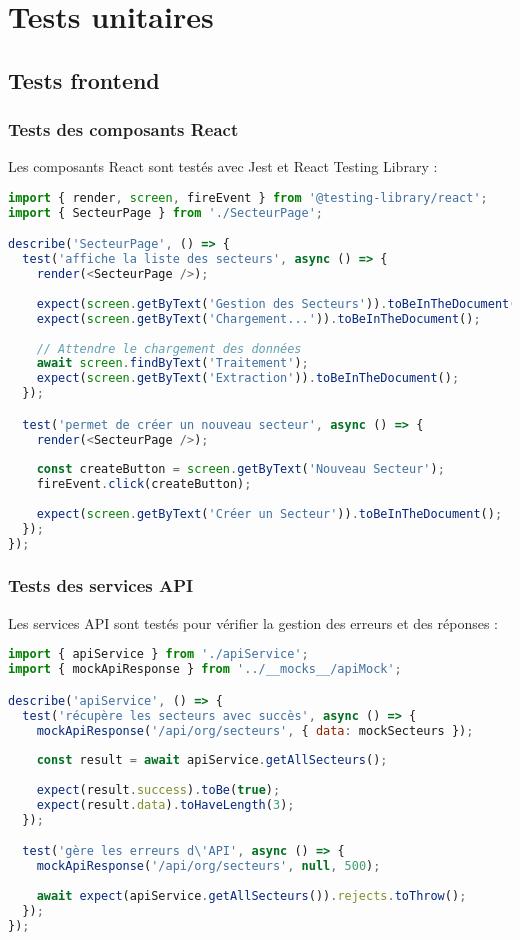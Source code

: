 \section{Tests unitaires}
\subsection{Tests frontend}
\subsubsection{Tests des composants React}
Les composants React sont testés avec Jest et React Testing Library :

\begin{lstlisting}[language=JavaScript, caption=Test d'un composant React]
import { render, screen, fireEvent } from '@testing-library/react';
import { SecteurPage } from './SecteurPage';

describe('SecteurPage', () => {
  test('affiche la liste des secteurs', async () => {
    render(<SecteurPage />);
    
    expect(screen.getByText('Gestion des Secteurs')).toBeInTheDocument();
    expect(screen.getByText('Chargement...')).toBeInTheDocument();
    
    // Attendre le chargement des données
    await screen.findByText('Traitement');
    expect(screen.getByText('Extraction')).toBeInTheDocument();
  });

  test('permet de créer un nouveau secteur', async () => {
    render(<SecteurPage />);
    
    const createButton = screen.getByText('Nouveau Secteur');
    fireEvent.click(createButton);
    
    expect(screen.getByText('Créer un Secteur')).toBeInTheDocument();
  });
});
\end{lstlisting}

\subsubsection{Tests des services API}
Les services API sont testés pour vérifier la gestion des erreurs et des réponses :

\begin{lstlisting}[language=JavaScript, caption=Test d'un service API]
import { apiService } from './apiService';
import { mockApiResponse } from '../__mocks__/apiMock';

describe('apiService', () => {
  test('récupère les secteurs avec succès', async () => {
    mockApiResponse('/api/org/secteurs', { data: mockSecteurs });
    
    const result = await apiService.getAllSecteurs();
    
    expect(result.success).toBe(true);
    expect(result.data).toHaveLength(3);
  });

  test('gère les erreurs d\'API', async () => {
    mockApiResponse('/api/org/secteurs', null, 500);
    
    await expect(apiService.getAllSecteurs()).rejects.toThrow();
  });
});
\end{lstlisting}

